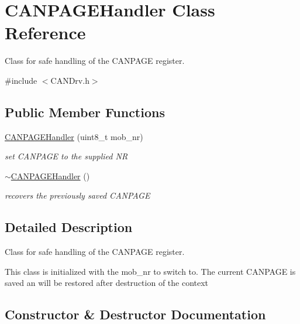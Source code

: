 \hypertarget{class_c_a_n_p_a_g_e_handler}{}\section{C\+A\+N\+P\+A\+G\+E\+Handler Class Reference}
\label{class_c_a_n_p_a_g_e_handler}


Class for safe handling of the C\+A\+N\+P\+A\+GE register.  




{\ttfamily \#include $<$C\+A\+N\+Drv.\+h$>$}

\subsection*{Public Member Functions}
\begin{DoxyCompactItemize}
\item 
\hyperlink{class_c_a_n_p_a_g_e_handler_a0cf78f025940197195c4f13857551399}{C\+A\+N\+P\+A\+G\+E\+Handler} (uint8\+\_\+t mob\+\_\+nr)
\begin{DoxyCompactList}\small\item\em set C\+A\+N\+P\+A\+GE to the supplied NR \end{DoxyCompactList}\item 
\hyperlink{class_c_a_n_p_a_g_e_handler_ae3b23150582048c8f1a8126a3c06049a}{$\sim$\+C\+A\+N\+P\+A\+G\+E\+Handler} ()
\begin{DoxyCompactList}\small\item\em recovers the previously saved C\+A\+N\+P\+A\+GE \end{DoxyCompactList}\end{DoxyCompactItemize}


\subsection{Detailed Description}
Class for safe handling of the C\+A\+N\+P\+A\+GE register. 

This class is initialized with the mob\+\_\+nr to switch to. The current C\+A\+N\+P\+A\+GE is saved an will be restored after destruction of the context 

\subsection{Constructor \& Destructor Documentation}
\hypertarget{class_c_a_n_p_a_g_e_handler_a0cf78f025940197195c4f13857551399}{}\label{class_c_a_n_p_a_g_e_handler_a0cf78f025940197195c4f13857551399} 
